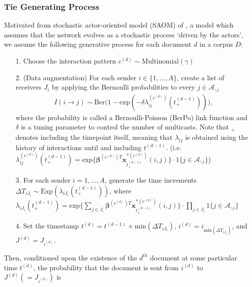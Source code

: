 \documentclass[a4paper]{article}
\begin{document}
\subsubsection{Tie Generating Process}
Motivated from stochastic actor-oriented model (SAOM) of \cite{snijders2017stochastic}, a model which assumes that the network evolves as a stochastic process `driven by the actors’, we assume the following generative process for each document $d$ in a corpus $D$:
\begin{itemize}
	\item[1.] Choose the interaction pattern $c^{(d)} \sim \mbox{Multinomial}(\gamma)$
	\item[2.] (Data augmentation) For each sender $i \in \{1,...,A\}$, create a list of receivers $J_i$ by applying the Bernoulli probabilities to every $j \in \mathcal{A}_{\backslash i}$
	\begin{align*} I(i \rightarrow j) \sim \mbox{Ber}\Big(1-\mbox{exp}(-\delta\lambda^{(c^{(d)})}_{ij}(t_+^{(d-1)}))\Big),
	\end{align*}
	where the probability is called a Bernoulli-Poisson (BerPo) link function \citep{zhou2015infinite} and $\delta$ is a tuning parameter to control the number of multicasts. Note that $_+$ denotes including the timepoint itself, meaning that $\lambda_{ij}$ is obtained using the history of interactions until and including $t^{(d-1)}$. (i.e. $\lambda^{(c^{(d)})}_{ij}(t_+^{(d-1)})=\mbox{exp}\Big\{\boldsymbol{\beta}^{(c^{(d)})T}\boldsymbol{x}^{*(c^{(d)})}_{t^{(d-1)}_+}(i, j)\Big\}\cdot 1\{j \in \mathcal{A}_{\backslash i}\}$)
	\item[3.] For each sender $i = 1,...,A$, generate the time increments $\Delta T_{i{J_i}} \sim \mbox{Exp}(\lambda_{i{J_i}}(t_+^{(d-1)}))$, where $\lambda_{i{J_i}}(t_+^{(d-1)})= \mbox{exp}\Big\{\sum\limits_{j \in{J_i}}\boldsymbol{\beta}^{(c^{(d)})T}\boldsymbol{x}^{*(c^{(d)})}_{t^{(d-1)}_+}(i, j)\Big\}\cdot \prod\limits_{j \in J_i}1\{j \in \mathcal{A}_{\backslash i}\}$
	 \item[4.] Set the timestamp $t^{(d)} = t^{(d-1)}+\mbox{min}(\Delta T_{i{J_i}})$, $i^{(d)} = i_{\mbox{min}(\Delta T_{i{J_i}})}$, and $J^{(d)} = J_{i^{(d)}}$.
\end{itemize}
Then, conditioned upon the existence of the $d^{th}$ document at some particular time $t^{(d)}$, the probability that the document is sent from $i^{(d)}$ to $J^{(d)} (=J_{i^{(d)}})$ is
\end{document}
